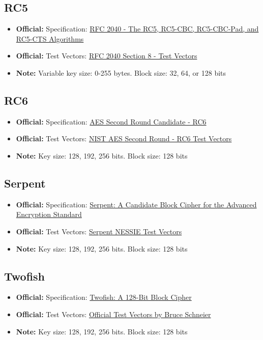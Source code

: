 \documentclass[12pt,a4paper]{article}
\newcommand{\official}[1]{\textcolor{citegreen}{\textbf{Official:}} #1}
\newcommand{\note}[1]{\textcolor{noteorange}{\textbf{Note:}} #1}
\newcommand{\link}[2]{\href{#1}{#2}}
\begin{document}
\subsection{RC5}
\begin{itemize}
    \item \official{Specification:} \link{https://tools.ietf.org/html/rfc2040}{RFC 2040 - The RC5, RC5-CBC, RC5-CBC-Pad, and RC5-CTS Algorithms}
    \item \official{Test Vectors:} \link{https://tools.ietf.org/html/rfc2040#section-8}{RFC 2040 Section 8 - Test Vectors}
    \item \note{Variable key size: 0-255 bytes. Block size: 32, 64, or 128 bits}
\end{itemize}

\subsection{RC6}
\begin{itemize}
    \item \official{Specification:} \link{https://www.nist.gov/system/files/documents/2017/05/09/aes2ndrnd.pdf}{AES Second Round Candidate - RC6}
    \item \official{Test Vectors:} \link{https://www.nist.gov/system/files/documents/2017/05/09/aes2ndrnd.pdf}{NIST AES Second Round - RC6 Test Vectors}
    \item \note{Key size: 128, 192, 256 bits. Block size: 128 bits}
\end{itemize}

\subsection{Serpent}
\begin{itemize}
    \item \official{Specification:} \link{https://www.cl.cam.ac.uk/~rja14/serpent.html}{Serpent: A Candidate Block Cipher for the Advanced Encryption Standard}
    \item \official{Test Vectors:} \link{https://biham.cs.technion.ac.il/Reports/Serpent/Serpent-128-128.verified.test-vectors}{Serpent NESSIE Test Vectors}
    \item \note{Key size: 128, 192, 256 bits. Block size: 128 bits}
\end{itemize}

\subsection{Twofish}
\begin{itemize}
    \item \official{Specification:} \link{https://www.schneier.com/academic/twofish/}{Twofish: A 128-Bit Block Cipher}
    \item \official{Test Vectors:} \link{https://www.schneier.com/code/twofish-test-vectors.txt}{Official Test Vectors by Bruce Schneier}
    \item \note{Key size: 128, 192, 256 bits. Block size: 128 bits}
\end{itemize}
\end{document}
